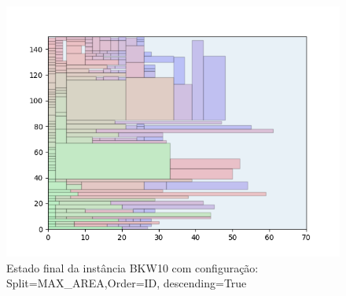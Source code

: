 \begin{figure}[H]
    \centering
    \caption[]{Estado final da instância BKW10 com configuração: Split=MAX_AREA,Order=ID, descending=True}
    \label{fig:bkw10-max_area-id-true}
    \includegraphics[scale=0.5]{output/figures/bkw/bkw10/max_area/id/true/000}
\end{figure}